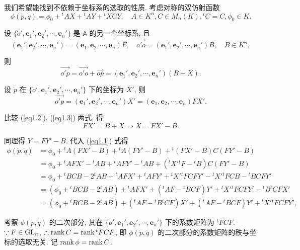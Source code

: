 \documentclass{ctexart}
\begin{document}
我们希望能找到不依赖于坐标系的选取的性质. 考虑对称的双仿射函数
\begin{equation}\label{eq1.1}
    \phi(\dot{p},\dot{q})=\phi_0+{}^tAX+{}^tAY+{}^tXCY,\quad A\in K^n,C\in M_n(K),{}^tC=C,\phi_0\in K.
\end{equation}

设 $\{\dot{o}',\boldsymbol{e}_1',\boldsymbol{e}_2',\cdots,\boldsymbol{e}_n'\}$ 是 $\mathbb{A}$ 的另一个坐标系, 且
\[(\boldsymbol{e}_1',\boldsymbol{e}_2',\cdots,\boldsymbol{e}_n')=(\boldsymbol{e}_1,\boldsymbol{e}_2,\cdots,\boldsymbol{e}_n)F,\quad\overrightarrow{o'o}=(\boldsymbol{e}_1',\boldsymbol{e}_2',\cdots,\boldsymbol{e}_n')B,\quad B\in K^n,\]

则
\begin{equation}\label{eq1.2}
    \overrightarrow{o'p}=\overrightarrow{o'o}+\overrightarrow{op}=(\boldsymbol{e}_1',\boldsymbol{e}_2',\cdots,\boldsymbol{e}_n')(B+X).
\end{equation}

设 $\dot{p}$ 在 $\{\dot{o}',\boldsymbol{e}_1',\boldsymbol{e}_2',\cdots,\boldsymbol{e}_n'\}$ 下的坐标为 $X'$, 则
\begin{equation}\label{eq1.3}
    \overrightarrow{o'p}=(\boldsymbol{e}_1',\boldsymbol{e}_2',\cdots,\boldsymbol{e}_n')X'=(\boldsymbol{e}_1,\boldsymbol{e}_2,\cdots,\boldsymbol{e}_n)FX'.
\end{equation}

比较 (\ref{eq1.2}), (\ref{eq1.3}) 两式, 得
\[FX'=B+X\Rightarrow X=FX'-B.\]

同理得 $Y=FY'-B$. 代入 (\ref{eq1.1}) 式得
\begin{align*}
    \phi(\dot{p},\dot{q}) & =\phi_0+{}^tA(FX'-B)+{}^tA(FY'-B)+{}^t(FX'-B)C(FY'-B) \\
    & =\phi_0+{}^tAFX'-{}^tAB+{}^tAFY'-{}^tAB+({}^tX'{}^tF-{}^tB)C(FY'-B) \\
    & =\phi_0+{}^tBCB-2{}^tAB+{}^tAFX'+{}^tAFY'+{}^tX'{}^tFCFY'-{}^tX'{}^tFCB-{}^tBCFY' \\
    & =(\phi_0+{}^tBCB-2{}^tAB)+{}^tAFX'+({}^tAF-{}^tBCF)Y'+{}^tX'{}^tFCFY'-{}^tB{}^tCFX' \\
    & =(\phi_0+{}^tBCB-2{}^tAB)+({}^tAF-{}^tB{}^tCF)X'+({}^tAF-{}^tBCF)Y'+{}^tX'{}^tFCFY',
\end{align*}

考察 $\phi(\dot{p},\dot{q})$ 的二次部分, 其在 $\{\dot{o}',\boldsymbol{e}_1',\boldsymbol{e}_2',\cdots,\boldsymbol{e}_n'\}$ 下的系数矩阵为 ${}^tFCF$. $\because F\in\operatorname{GL} _n$, $\therefore\operatorname{rank} C=\operatorname{rank} {}^tFCF$, 即 $\phi(\dot{p},\dot{q})$ 的二次部分的系数矩阵的秩与坐标的选取无关. 记 $\operatorname{rank} \phi=\operatorname{rank} C$.
\end{document}
